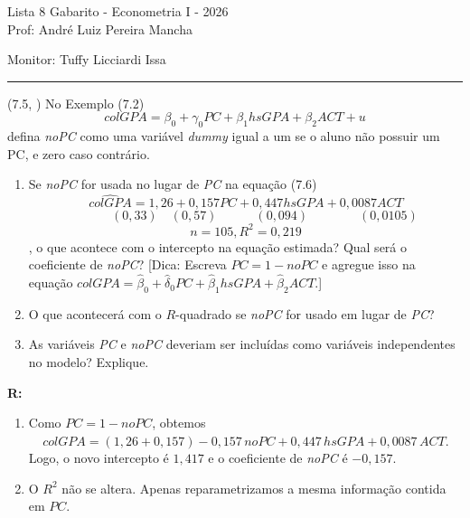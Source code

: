 \documentclass[12pt,letterpaper, onecolumn]{exam}
\renewenvironment{solution}
{\par\noindent\textbf{R:}\enspace\color{blue}}
{\par\color{black}}
\begin{document}
\begingroup
\centering
\LARGE Lista 8 Gabarito - Econometria I - 2026\\[0.5em]
\large Prof: André Luiz Pereira Mancha \par
\large Monitor: Tuffy Licciardi Issa \par
\endgroup
\rule{\textwidth}{0.4pt}
\pointsdroppedatright
\printanswers
\renewcommand{\solutiontitle}{\noindent\textbf{Ans:}\enspace}
\newcommand{\qstar}{\hspace{-0.6em}\textsuperscript{*}\hspace{0.2em}}

\begin{questions}

\question (7.5, \citep{wooldridge2016}) No Exemplo (7.2)
\[
colGPA = \beta_0 + \gamma_0PC + \beta_1hsGPA + \beta_2ACT + u
\]
defina \textit{noPC} como uma variável \textit{dummy} igual a um se o aluno não possuir um PC, e zero caso contrário.
\begin{enumerate}[label=(\roman*)]
    \item Se \textit{noPC} for usada no lugar de \textit{PC} na equação (7.6)
    \[
    \widehat{colGPA} = 1,26 + 0,157PC + 0,447hsGPA + 0,0087ACT
    \]
    \[
    \quad \quad \quad (0,33) \quad (0,57) \quad \quad \quad(0,094)  \quad  \quad \quad \quad (0,0105)
    \]
    \[
    n = 105, R^2 =0,219
    \]
    , o que acontece com o intercepto na equação estimada? Qual será o coeficiente de \textit{noPC}? [Dica: Escreva \(PC = 1 - noPC\) e agregue isso na equação \(colGPA = \hat\beta_0 + \hat\delta_0 PC + \hat\beta_1 hsGPA + \hat\beta_2 ACT\).]
    \item O que acontecerá com o \(R\)-quadrado se \textit{noPC} for usado em lugar de \textit{PC}?
    \item As variáveis \textit{PC} e \textit{noPC} deveriam ser incluídas como variáveis independentes no modelo? Explique.
\end{enumerate}

\begin{solution}
\begin{enumerate}[label=(\roman*)]
    \item Como \(PC = 1 - noPC\), obtemos
    \[
    \widehat{colGPA}
    =
    (1,26 + 0,157) - 0,157\,noPC + 0,447\,hsGPA + 0,0087\,ACT.
    \]
    Logo, o novo intercepto é \(1,417\) e o coeficiente de \textit{noPC} é \(-0,157\).

    \item O \(R^2\) não se altera. Apenas reparametrizamos a mesma informação contida em \(PC\).


\end{enumerate}
\end{solution}
\end{questions}
\end{document}
